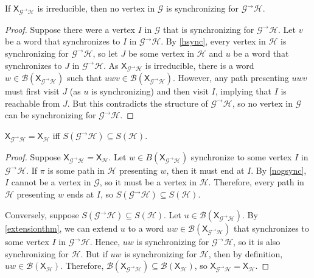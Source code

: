 \documentclass{article}
\newcommand{\Gc}{\mathcal{G}}  %
\newcommand{\Hc}{\mathcal{H}}  %
\newcommand{\Vc}{\mathcal{V}}
\newcommand{\Bc}{\mathcal{B}}
\newcommand{\GtH}{\Gc^\to\Hc}
\newcommand{\shift}[1]{\mathsf{X}_{#1}}
\theoremstyle{definition}
\begin{document}
\begin{theorem}\label{nogsync}
    If \(\shift{\GtH}\) is irreducible, then no vertex in \(\Gc\) is synchronizing for \(\GtH\).
\end{theorem}

\begin{proof}
    Suppose there were a vertex \(I\) in \(\Gc\) that is synchronizing for \(\GtH\). 
    Let \(v\) be a word that synchronizes to \(I\) in \(\GtH\). By \ref{hsync}, every vertex in \(\Hc\) 
    is synchronizing for \(\GtH\), so let \(J\) be some vertex in \(\Hc\) and \(u\) be a word that synchronizes to 
    \(J\) in \(\GtH\). As \(\shift{\GtH}\) is irreducible, there is a word \(w \in \Bc(\shift{\GtH})\) 
    such that \(uwv \in \Bc(\shift{\GtH})\). However, any path presenting \(uwv\) must first visit 
    \(J\) (as \(u\) is synchronizing) and then visit \(I\), implying that \(I\) is reachable 
    from \(J\). But this contradicts the structure of \(\GtH\), so no vertex in \(\Gc\) can be 
    synchronizing for \(\GtH\).
\end{proof}

\begin{theorem}
    \(\shift{\GtH} = \shift{\Hc}\) iff \(S(\GtH) \subseteq S(\Hc)\).
\end{theorem}

\begin{proof}
    Suppose \(\shift{\GtH} = \shift{\Hc}\). Let \(w \in B(\shift{\GtH})\) synchronize to some vertex \(I\)
    in \(\GtH\).
    If \(\pi\) is some path in \(\Hc\) presenting \(w\), then it must end at \(I\). By 
    \ref{nogsync}, \(I\) cannot be a vertex in \(\Gc\), so it must be a vertex in \(\Hc\).
    Therefore, every path in \(\Hc\) presenting \(w\) ends at \(I\), so \(S(\GtH) \subseteq S(\Hc)\).

    Conversely, suppose \(S(\GtH) \subseteq S(\Hc)\). Let \(u \in \Bc(\shift{\GtH})\).
    By \ref{extensionthm}, we can extend \(u\) to a word \(uw \in \Bc(\shift{\GtH})\) that 
    synchronizes to some vertex \(I\) in \(\GtH\). Hence, \(uw\) is synchronizing 
    for \(\GtH\), so it is also synchronizing for \(\Hc\). But if \(uw\) is synchronizing for
    \(\Hc\), then by definition, \(uw \in \Bc(\shift{\Hc})\). Therefore, \(\Bc(\shift{\GtH}) \subseteq \Bc(\shift{\Hc})\),
    so \(\shift{\GtH} = \shift{\Hc}\).
\end{proof}

\end{document}
